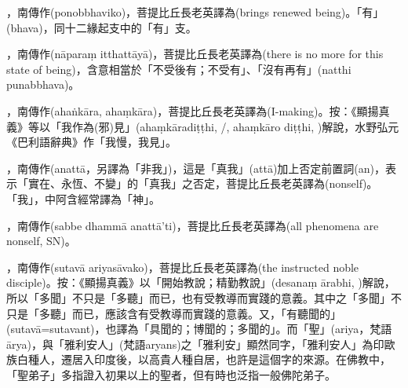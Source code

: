 \startitemgroup[noteitems]
\item{}，南傳作(ponobbhaviko)，菩提比丘長老英譯為(brings renewed being)。「有」(bhava)，同十二緣起支中的「有」支。
\item{}，南傳作(nāparaṃ itthattāyā)，菩提比丘長老英譯為(there is no more for this state of being)，含意相當於「不受後有；不受有」、「沒有再有」(natthi punabbhava)。
\stopitemgroup

\startitemgroup[noteitems]
\item{}，南傳作(ahaṅkāra, ahaṃkāra)，菩提比丘長老英譯為(I-making)。按：《顯揚真義》等以「我作為(邪)見」(ahaṃkāradiṭṭhi, /, ahaṃkāro diṭṭhi, )解說，水野弘元《巴利語辭典》作「我慢，我見」。
\stopitemgroup

\startitemgroup[noteitems]
\item{}，南傳作(anattā，另譯為「非我」)，這是「真我」(attā)加上否定前置詞(an)，表示「實在、永恆、不變」的「真我」之否定，菩提比丘長老英譯為(nonself)。「我」，中阿含經常譯為「神」。
\item{}，南傳作(sabbe dhammā anattā’ti)，菩提比丘長老英譯為(all phenomena are nonself, SN)。
\stopitemgroup

\startitemgroup[noteitems]
\item{}，南傳作(sutavā ariyasāvako)，菩提比丘長老英譯為(the instructed noble disciple)。按：《顯揚真義》以「開始教說；精勤教說」(desanaṃ ārabhi, )解說，所以「多聞」不只是「多聽」而已，也有受教導而實踐的意義。其中之「多聞」不只是「多聽」而已，應該含有受教導而實踐的意義。又，「有聽聞的」(sutavā=sutavant)，也譯為「具聞的；博聞的；多聞的」。而「聖」(ariya，梵語ārya)，與「雅利安人」(梵語aryans)之「雅利安」顯然同字，「雅利安人」為印歐族白種人，遷居入印度後，以高貴人種自居，也許是這個字的來源。在佛教中，「聖弟子」多指證入初果以上的聖者，但有時也泛指一般佛陀弟子。
\stopitemgroup

